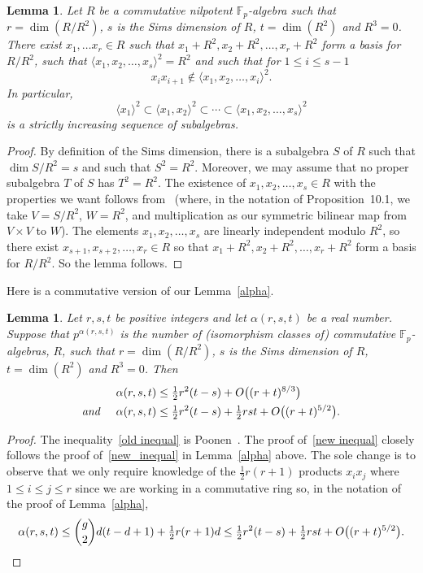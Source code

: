 \documentclass[12pt]{article}
\newtheorem{Lem}[Thm]{Lemma}
\begin{document}
\begin{Lem}
\label{lemma:subalgebra_tower}
Let $R$ be a commutative nilpotent $\mathbb{F}_p$-algebra such that $r=\dim (R/R^2)$, $s$ is the Sims dimension of $R$, $t=\dim(R^2)$ and $R^3=0$. There exist $x_1,\ldots x_r\in R$ such that $x_1+R^2,x_2+R^2,\ldots,x_r+R^2$ form a basis for $R/R^2$, such that $\langle x_1,x_2,\ldots,x_s \rangle^2=R^2$ and such that for $1\leq i\leq s-1$
\[
x_ix_{i+1}\notin \langle x_1,x_2,\ldots,x_i\rangle^2.
\]
In particular,
\[
\langle x_1\rangle^2\subset \langle x_1,x_2\rangle^2\subset \cdots \subset \langle x_1,x_2,\ldots,x_s \rangle^2
\]
is a strictly increasing sequence of subalgebras.
\end{Lem}
\begin{proof}
By definition of the Sims dimension, there is a subalgebra $S$ of $R$ such that $\dim S/R^2=s$ and such that $S^2=R^2$. Moreover, we may assume that no proper subalgebra $T$ of $S$ has $T^2=R^2$. The existence of $x_1,x_2,\ldots,x_s\in R$ with the properties we want follows from~\cite[Proposition~10.1]{Poonen} (where, in the notation of Proposition~10.1, we take $V=S/R^2$, $W=R^2$, and multiplication as our symmetric bilinear map from $V\times V$ to $W$). The elements $x_1,x_2,\ldots,x_s$ are linearly independent modulo $R^2$, so there exist $x_{s+1},x_{s+2},\ldots,x_r\in R$ so that  $x_1+R^2,x_2+R^2,\ldots,x_r+R^2$ form a basis for $R/R^2$. So the lemma follows.
\end{proof}

Here is a commutative version of our Lemma~\ref{alpha}.

\begin{Lem}
\label{lemma:commutative_Sims}
Let $r, s, t$ be positive integers and let $\alpha(r, s, t)$ be a real number. Suppose that $p^{\alpha(r, s, t)}$ is the number of (isomorphism classes of) commutative $\mathbb{F}_{p}$-algebras, $R$, such that $r = \dim(R/R^{2})$, $s$ is the Sims dimension of $R$, $t = \dim(R^{2})$ and $R^{3} = 0$. Then 
\begin{align}
\alpha(r, s, t) & \leq  \tfrac{1}{2}r^{2}(t - s) + \mathnormal{O}\big((r + t)^{8/3}\big)  \label{old inequal} \\
 \textit{and} \hspace{5 mm} \alpha(r, s, t) & \leq  \tfrac{1}{2}r^{2}(t - s) + \tfrac{1}{2}rst + \mathnormal{O}\big((r + t)^{5/2}\big). \label{new inequal}
\end{align}
\end{Lem}
\begin{proof}
The inequality~\eqref{old inequal} is Poonen~\cite[Proposition~10.4]{Poonen}. The proof of~\eqref{new inequal} closely follows the proof of~\eqref{new_inequal} in Lemma~\ref{alpha} above. The sole change is to observe that we only require knowledge of the $\frac{1}{2}r(r+1)$ products $x_ix_j$ where $1\leq i\leq j\leq r$ since we are working in a commutative ring so, in the notation of the proof of Lemma~\ref{alpha},
\[
\alpha(r,s,t)\leq \binom{g}{2}d(t-d+1)+\tfrac{1}{2}r(r+1)d\leq \tfrac{1}{2}r^{2}(t - s) + \tfrac{1}{2}rst + \mathnormal{O}\big((r + t)^{5/2}\big).\qedhere
\]
\end{proof}
\end{document}

